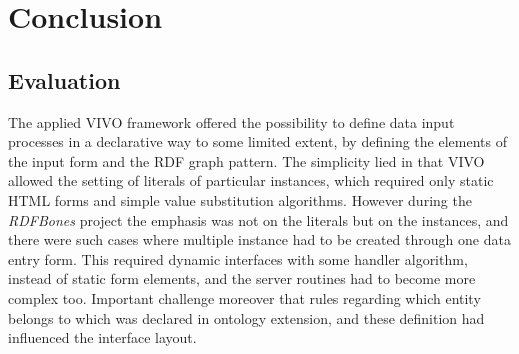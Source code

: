 

\chapter{Conclusion}

\section{Evaluation}

The applied VIVO framework offered the possibility to define data input processes in a declarative way to some limited extent, by defining the elements of the input form and the RDF graph pattern. The simplicity lied in that VIVO allowed the setting of literals of particular instances, which required only static HTML forms and simple value substitution algorithms. However during the \textit{RDFBones} project the emphasis was not on the literals but on the instances, and there were such cases where multiple instance had to be created through one data entry form. This required dynamic interfaces with some handler algorithm, instead of static form elements, and the server routines had to become more complex too. Important challenge moreover that rules regarding which entity belongs to which was declared in ontology extension, and these definition had influenced the interface layout.

